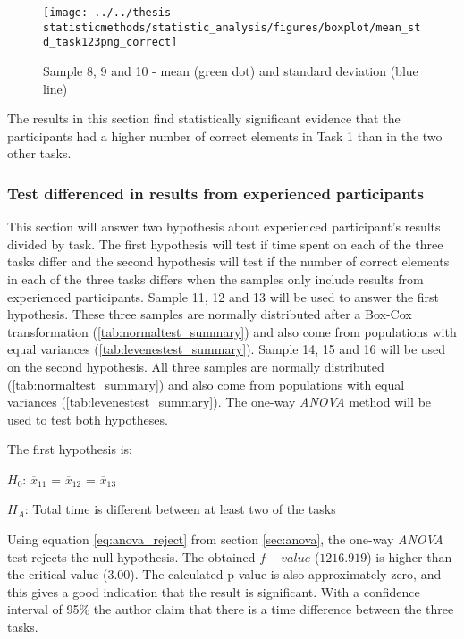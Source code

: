 \begin{figure}[H]
	\centering
	\texttt{[image: ../../thesis-statisticmethods/statistic\_analysis/figures/boxplot/mean\_std\_task123png\_correct]}
	\caption{Sample 8, 9 and 10 - mean (green dot) and standard deviation (blue line)}
	\label{fig:meanstdtask123pngcorrect}
\end{figure}

\vspace{0.3cm}

The results in this section find statistically significant evidence that the participants had a higher number of correct elements in Task 1 than in the two other tasks. 

\subsubsection[Sample 11 - 16]{Test differenced in results from experienced participants}\label{sec:sample_11_12_13_anova}
This section will answer two hypothesis about experienced participant's results divided by task. The first hypothesis will test if time spent on each of the three tasks differ and the second hypothesis will test if the number of correct elements in each of the three tasks differs when the samples only include results from experienced participants. Sample 11, 12 and 13 will be used to answer the first hypothesis. These three samples are normally distributed after a Box-Cox transformation (\ref{tab:normaltest_summary}) and also come from populations with equal variances (\ref{tab:levenestest_summary}). Sample 14, 15 and 16 will be used on the second hypothesis. All three samples are normally distributed (\ref{tab:normaltest_summary}) and also come from populations with equal variances (\ref{tab:levenestest_summary}). The one-way \textit{ANOVA} method will be used to test both hypotheses. 

The first hypothesis is:\\
\centerline{$H_{0}$: $\overline{x}_{11}$ = $\overline{x}_{12}$ = $\overline{x}_{13}$}
\centerline{$H_{A}$: Total time is different between at least two of the tasks}
\vspace{0.2cm}

Using equation \ref{eq:anova_reject}  from section \ref{sec:anova}, the one-way \textit{ANOVA} test rejects the null hypothesis. The obtained $f-value$ ($1216.919$) is higher than the critical value ($3.00$). The calculated p-value is also approximately zero, and this gives a good indication that the result is significant. With a confidence interval of 95\% the author claim that there is a time difference between the three tasks. 

